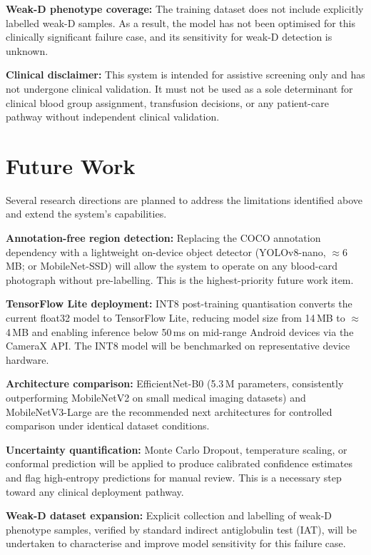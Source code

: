 \documentclass[journal]{IEEEtran}
\begin{document}
\textbf{Weak-D phenotype coverage:} The training dataset does not
include explicitly labelled weak-D samples.
As a result, the model has not been optimised for this clinically
significant failure case, and its sensitivity for weak-D detection
is unknown.

\textbf{Clinical disclaimer:} This system is intended for assistive
screening only and has not undergone clinical validation.
It must not be used as a sole determinant for clinical blood group
assignment, transfusion decisions, or any patient-care pathway
without independent clinical validation.

\section{Future Work}
\label{sec:future}

Several research directions are planned to address the limitations
identified above and extend the system's capabilities.

\textbf{Annotation-free region detection:}
Replacing the COCO annotation dependency with a lightweight
on-device object detector (YOLOv8-nano, $\approx$6\,MB; or
MobileNet-SSD) will allow the system to operate on any blood-card
photograph without pre-labelling.
This is the highest-priority future work item.

\textbf{TensorFlow Lite deployment:}
INT8 post-training quantisation converts the current float32 model
to TensorFlow Lite, reducing model size from 14\,MB to
$\approx$4\,MB and enabling inference below 50\,ms on mid-range
Android devices via the CameraX API.
The INT8 model will be benchmarked on representative device hardware.

\textbf{Architecture comparison:}
EfficientNet-B0 (5.3\,M parameters, consistently outperforming
MobileNetV2 on small medical imaging datasets) and MobileNetV3-Large
are the recommended next architectures for controlled comparison
under identical dataset conditions.

\textbf{Uncertainty quantification:}
Monte Carlo Dropout, temperature scaling, or conformal prediction
will be applied to produce calibrated confidence estimates and flag
high-entropy predictions for manual review.
This is a necessary step toward any clinical deployment pathway.

\textbf{Weak-D dataset expansion:}
Explicit collection and labelling of weak-D phenotype samples,
verified by standard indirect antiglobulin test (IAT), will be
undertaken to characterise and improve model sensitivity for this
failure case.
\end{document}
